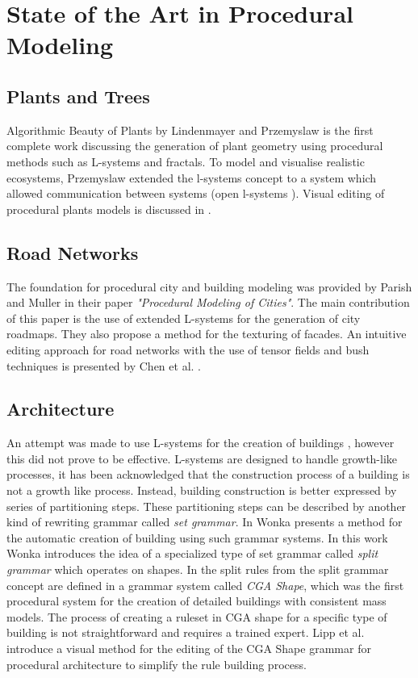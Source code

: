 
\chapter{State of the Art in Procedural Modeling}
\label{sec:relatedwork}

\section{Plants and Trees}
Algorithmic Beauty of Plants by Lindenmayer and Przemyslaw \citep{PrzemyslawAlgoBeauty} is the first complete work discussing the generation of plant geometry using procedural methods such as L-systems and fractals. To model and visualise realistic ecosystems, Przemyslaw extended the l-systems concept to a system which allowed communication between systems (open l-systems \citep{PrzemyslawPlants} \citep{Deussen98}). Visual editing of procedural plants models is discussed in \citet{interactivebonsai}. 

\section{Road Networks}
The foundation for procedural city and building modeling was provided by Parish and Muller \citet{Parish01} in their paper \emph{"Procedural Modeling of Cities"}. The main contribution of this paper is the use of extended L-systems for the generation of city roadmaps. They also propose a method for the texturing of facades. An intuitive editing approach for road networks with the use of tensor fields and bush techniques is presented by Chen et al. \citet{Chen08}. 

\section{Architecture}
An attempt was made to use L-systems for the creation of buildings \citet{Parish01}, however this did not prove to be effective. L-systems are designed to handle growth-like processes, it has been acknowledged that the construction process of a building is not a growth like process. Instead, building construction is better expressed by series of partitioning steps. These partitioning steps can be described by another kind of rewriting grammar called \emph{set grammar}. In \citet{Wonka03} Wonka presents a method for the automatic creation of building using such grammar systems. In this work Wonka introduces the idea of a specialized type of set grammar called \emph{split grammar} which operates on shapes. In \citet{Muller06} the split rules from the split grammar concept are defined in a grammar system called \emph{CGA Shape}, which was the first procedural system for the creation of detailed buildings with consistent mass 
models. The process of creating a ruleset in CGA shape for a specific type of building is not straightforward and requires a trained expert. Lipp et al. \citet{Lipp08} introduce a visual method for the editing of the CGA Shape grammar for procedural architecture to simplify the rule building process.
